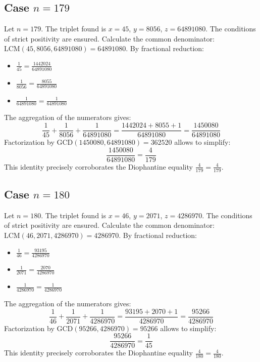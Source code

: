 \documentclass[11pt,a4paper]{article}
\begin{document}
\subsection{Case $n = 179$}
Let $n = 179$. The triplet found is $x = 45$, $y = 8056$, $z = 64891080$.
The conditions of strict positivity are ensured.
Calculate the common denominator: $\text{LCM}(45, 8056, 64891080) = 64891080$.
By fractional reduction:
\begin{itemize}
    \item $\frac{1}{45} = \frac{1442024}{64891080}$
    \item $\frac{1}{8056} = \frac{8055}{64891080}$
    \item $\frac{1}{64891080} = \frac{1}{64891080}$
\end{itemize}
The aggregation of the numerators gives:
$$ \frac{1}{45} + \frac{1}{8056} + \frac{1}{64891080} = \frac{1442024 + 8055 + 1}{64891080} = \frac{1450080}{64891080} $$
Factorization by $\text{GCD}(1450080, 64891080) = 362520$ allows to simplify:
$$ \frac{1450080}{64891080} = \frac{4}{179} $$
This identity precisely corroborates the Diophantine equality $\frac{4}{179} = \frac{4}{179}$.

\subsection{Case $n = 180$}
Let $n = 180$. The triplet found is $x = 46$, $y = 2071$, $z = 4286970$.
The conditions of strict positivity are ensured.
Calculate the common denominator: $\text{LCM}(46, 2071, 4286970) = 4286970$.
By fractional reduction:
\begin{itemize}
    \item $\frac{1}{46} = \frac{93195}{4286970}$
    \item $\frac{1}{2071} = \frac{2070}{4286970}$
    \item $\frac{1}{4286970} = \frac{1}{4286970}$
\end{itemize}
The aggregation of the numerators gives:
$$ \frac{1}{46} + \frac{1}{2071} + \frac{1}{4286970} = \frac{93195 + 2070 + 1}{4286970} = \frac{95266}{4286970} $$
Factorization by $\text{GCD}(95266, 4286970) = 95266$ allows to simplify:
$$ \frac{95266}{4286970} = \frac{1}{45} $$
This identity precisely corroborates the Diophantine equality $\frac{4}{180} = \frac{4}{180}$.
\end{document}
